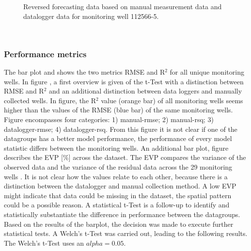 \begin{figure}[htbp]
\begin{minipage}{0.32\textwidth}
        \caption{Reversed forecasting data based on manual measurement data and datalogger data for monitoring well 112566-5.}
        \label{combi}
    \end{minipage}
\end{figure} \\
\newpage
\subsubsection{Performance metrics}
The bar plot  and  shows the two metrics RMSE and R$^2$ for all unique monitoring wells. In figure , a first overview is given of the t-Test with a distinction between RMSE and R$^2$ and an additional distinction between data loggers and manually collected wells. In figure, the R$^2$ value (orange bar) of all monitoring wells seems higher than the values of the RMSE (blue bar) of the same monitoring wells. Figure  encompasses four categories: 1) manual-rmse; 2) manual-rsq; 3) datalogger-rmse; 4) datalogger-rsq. From this figure it is not clear if one of the datagroups has a better model performance, the performance of every model statistic differs between the monitoring wells. An additional bar plot, figure  describes the EVP [\%] across the dataset. The EVP compares the variance of the observed data and the variance of the residual data across the 29 monitoring wells \cite{asmuth-2021}. It is not clear how the values relate to each other, because there is a distinction between the datalogger and manual collection method. A low EVP might indicate that data could be missing in the dataset, the spatial pattern could be a possible reason. A statistical t-Test is a follow-up to identify and statistically substantiate the difference in performance between the datagroups. Based on the results of the barplot, the decision was made to execute further statistical tests. A Welch's t-Test was carried out, leading to the following results. The Welch's t-Test uses an  \(alpha = 0.05\).
